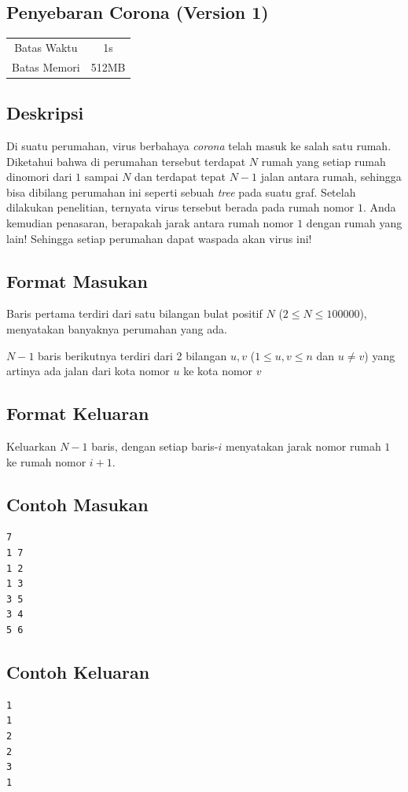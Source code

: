 \documentclass{article}
\begin{document}
\begin{center}
    \section*{Penyebaran Corona (Version 1)} %

    \begin{tabular}{ | c c | }
        \hline
        Batas Waktu  & 1s \\    %
        Batas Memori & 512MB \\  %
        \hline
    \end{tabular}
\end{center}

\subsection*{Deskripsi}

Di suatu perumahan, virus berbahaya \textit{corona} telah masuk ke salah satu rumah. Diketahui bahwa di perumahan tersebut terdapat $N$ rumah yang setiap rumah dinomori dari $1$ sampai $N$ dan terdapat tepat $N - 1$ jalan antara rumah, sehingga bisa dibilang perumahan ini seperti sebuah \textit{tree} pada suatu graf. Setelah dilakukan penelitian, ternyata virus tersebut berada pada rumah nomor $1$. Anda kemudian penasaran, berapakah jarak antara rumah nomor $1$ dengan rumah yang lain! Sehingga setiap perumahan dapat waspada akan virus ini!

\subsection*{Format Masukan}

Baris pertama terdiri dari satu bilangan bulat positif $N$ ($2 \leq N \leq 100000$), menyatakan banyaknya perumahan yang ada.

$N-1$ baris berikutnya terdiri dari 2 bilangan $u, v$ ($1 \leq u, v \leq n$ dan $u \neq v$) yang artinya ada jalan dari kota nomor $u$ ke kota nomor $v$

\subsection*{Format Keluaran}

Keluarkan $N - 1$ baris, dengan setiap baris-$i$ menyatakan jarak nomor rumah $1$ ke rumah nomor $i + 1$.
\begin{multicols}{2}
\subsection*{Contoh Masukan}
\begin{lstlisting}
7
1 7
1 2
1 3
3 5
3 4
5 6
\end{lstlisting}
\columnbreak
\subsection*{Contoh Keluaran}
\begin{lstlisting}
1
1
2
2
3
1
\end{lstlisting}
\vfill
\null
\end{multicols}
\end{document}
